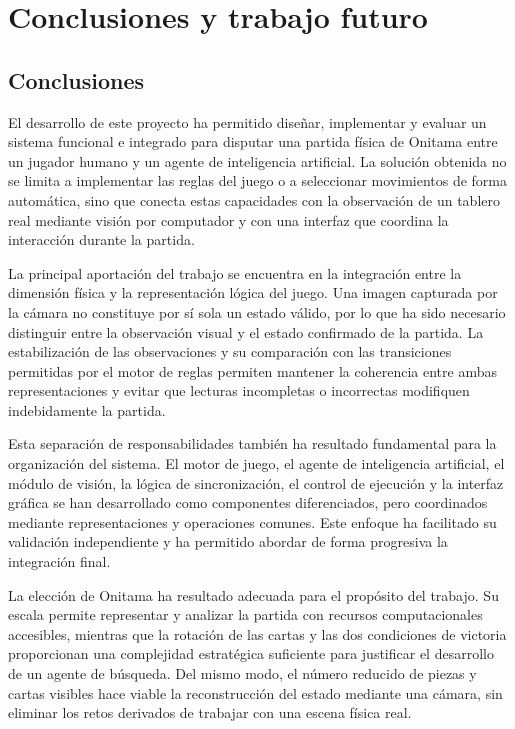 \chapter{Conclusiones y trabajo futuro}
\label{chap:conclusiones-trabajo-futuro}

\section{Conclusiones}
\label{sec:conclusiones}

El desarrollo de este proyecto ha permitido diseñar, implementar y evaluar un sistema funcional e integrado para disputar una partida física de Onitama entre un jugador humano y un agente de inteligencia artificial. La solución obtenida no se limita a implementar las reglas del juego o a seleccionar movimientos de forma automática, sino que conecta estas capacidades con la observación de un tablero real mediante visión por computador y con una interfaz que coordina la interacción durante la partida.

La principal aportación del trabajo se encuentra en la integración entre la dimensión física y la representación lógica del juego. Una imagen capturada por la cámara no constituye por sí sola un estado válido, por lo que ha sido necesario distinguir entre la observación visual y el estado confirmado de la partida. La estabilización de las observaciones y su comparación con las transiciones permitidas por el motor de reglas permiten mantener la coherencia entre ambas representaciones y evitar que lecturas incompletas o incorrectas modifiquen indebidamente la partida.

Esta separación de responsabilidades también ha resultado fundamental para la organización del sistema. El motor de juego, el agente de inteligencia artificial, el módulo de visión, la lógica de sincronización, el control de ejecución y la interfaz gráfica se han desarrollado como componentes diferenciados, pero coordinados mediante representaciones y operaciones comunes. Este enfoque ha facilitado su validación independiente y ha permitido abordar de forma progresiva la integración final.

La elección de Onitama ha resultado adecuada para el propósito del trabajo. Su escala permite representar y analizar la partida con recursos computacionales accesibles, mientras que la rotación de las cartas y las dos condiciones de victoria proporcionan una complejidad estratégica suficiente para justificar el desarrollo de un agente de búsqueda. Del mismo modo, el número reducido de piezas y cartas visibles hace viable la reconstrucción del estado mediante una cámara, sin eliminar los retos derivados de trabajar con una escena física real.

